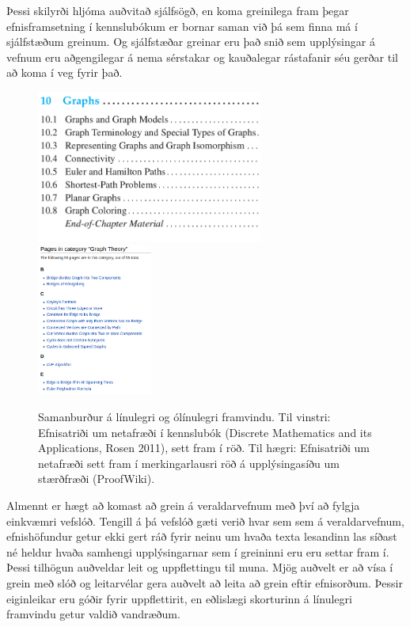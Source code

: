 \documentclass[a4paper,12pt,twoside,BCOR=10mm]{scrbook}
\begin{document}
Þessi skilyrði hljóma auðvitað sjálfsögð, en koma greinilega fram þegar efnisframsetning í kennslubókum er bornar saman við þá sem finna má í sjálfstæðum greinum. Og sjálfstæðar greinar eru það snið sem upplýsingar á vefnum eru aðgengilegar á nema sérstakar og kauðalegar rástafanir séu gerðar til að koma í veg fyrir það.

\begin{figure}
\caption[Samanburður á línulegri og ólínulegri framvindu]{Samanburður á línulegri og ólínulegri framvindu. Til vinstri: Efnisatriði um netafræði í kennslubók (Discrete Mathematics and its Applications, Rosen 2011), sett fram í röð. Til hægri: Efnisatriði um netafræði sett fram í merkingarlausri röð á upplýsingasíðu um stærðfræði (ProofWiki\footnotemark).}
\begin{center}
\includegraphics[height=5cm]{ordered-progression}
\hspace{1cm}
\includegraphics[height=5cm]{unordered-progression}
\end{center}
\end{figure}

Almennt er hægt að komast að grein á veraldarvefnum með því að fylgja einkvæmri vefslóð. Tengill á þá vefslóð gæti verið hvar sem sem á veraldarvefnum, efnishöfundur getur ekki gert ráð fyrir neinu um hvaða texta lesandinn las síðast né heldur hvaða samhengi upplýsingarnar sem í greininni eru eru settar fram í. Þessi tilhögun auðveldar leit og uppflettingu til muna. Mjög auðvelt er að vísa í grein með slóð og leitarvélar gera auðvelt að leita að grein eftir efnisorðum. Þessir eiginleikar eru góðir fyrir uppflettirit, en eðlislægi skorturinn á línulegri framvindu getur valdið vandræðum.
\end{document}
